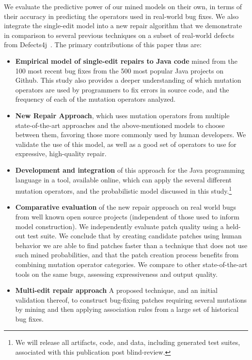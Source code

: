 \documentclass[conference]{IEEEtran}
\begin{document}
We evaluate the predictive power of our mined models on their own, in terms of their
accuracy in predicting the operators used in real-world bug fixes.  We also
integrate the single-edit model into a new repair algorithm that we demonstrate
in comparison to several previous techniques on a subset of real-world defects from Defects4j~\cite{just14}. 
%
The primary contributions of this paper thus are:
\begin{itemize}
\item \textbf{Empirical model of single-edit repairs to Java code} mined
      from the 100 most recent bug fixes from the 500 most popular Java projects on
    Github. This study also provides a deeper
    understanding of which mutation operators are used by programmers to fix
    errors in source code, and the frequency of each of the mutation operators
    analyzed. 
	\item \textbf{New Repair Approach}, which uses mutation operators
    from multiple state-of-the-art approaches and
    the above-mentioned models to choose between them, favoring those more commonly
    used by human developers.  We validate the use of this model, as well as a
    good set of operators to use for expressive, high-quality repair.
    \item \textbf{Development and integration} of this approach for the Java
      programming language in a tool, available online, which can apply the
      several different mutation operators, and the probabilistic model
      discussed in this study.\footnote{We will release all artifacts, code, and
        data, including generated test suites, associated with this publication post blind-review.} %
  \item \textbf{Comparative evaluation} of the new repair approach on real world bugs from well
    known open source projects (independent of those used to inform model
    construction). We independently evaluate patch quality using a held-out test
    suite. We conclude that by creating candidate patches using human behavior
    we are able to find patches faster than a technique that does not use such
    mined probabilities, and that the patch creation
    process benefits from combining mutation operator categories. We compare to
    other state-of-the-art tools on the same bugs, assessing expressiveness and
    output quality. 
  \item \textbf{Multi-edit repair approach} A proposed technique, and an initial
    validation thereof, to construct 
    bug-fixing patches requiring several mutations by mining and then applying association
    rules from a large set of historical bug fixes. 
\end{itemize}
\end{document}
